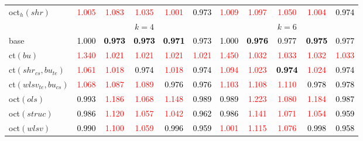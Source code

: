 \begin{tabular}[t]{l|>{}cccc>{}c|ccccc}
oct$_h(shr)$ & \textcolor{red}{1.005} & \textcolor{red}{1.083} & \textcolor{red}{1.035} & \textcolor{red}{1.001} & \textcolor{black}{0.973} & \textcolor{red}{1.009} & \textcolor{red}{1.097} & \textcolor{red}{1.050} & \textcolor{red}{1.004} & \textcolor{black}{0.974}\\
\addlinespace[0.3em]
\multicolumn{1}{c}{} & \multicolumn{5}{c}{\textbf{$k = 4$}} & \multicolumn{5}{c}{\textbf{$k = 6$}}\\
base & \textcolor{black}{1.000} & \textcolor{black}{\textbf{0.973}} & \textcolor{black}{\textbf{0.973}} & \textcolor{black}{\textbf{0.971}} & \textcolor{black}{0.973} & \textcolor{black}{1.000} & \textcolor{black}{\textbf{0.976}} & \textcolor{black}{0.977} & \textcolor{black}{\textbf{0.975}} & \textcolor{black}{0.977}\\
ct$(bu)$ & \textcolor{red}{1.340} & \textcolor{red}{1.021} & \textcolor{red}{1.021} & \textcolor{red}{1.021} & \textcolor{red}{1.021} & \textcolor{red}{1.450} & \textcolor{red}{1.032} & \textcolor{red}{1.033} & \textcolor{red}{1.032} & \textcolor{red}{1.033}\\
ct$(shr_{cs}, bu_{te})$ & \textcolor{red}{1.061} & \textcolor{red}{1.018} & \textcolor{black}{0.974} & \textcolor{red}{1.018} & \textcolor{black}{0.974} & \textcolor{red}{1.094} & \textcolor{red}{1.023} & \textcolor{black}{\textbf{0.974}} & \textcolor{red}{1.024} & \textcolor{black}{0.974}\\
ct$(wlsv_{te}, bu_{cs})$ & \textcolor{red}{1.068} & \textcolor{red}{1.087} & \textcolor{red}{1.089} & \textcolor{black}{0.976} & \textcolor{black}{0.976} & \textcolor{red}{1.103} & \textcolor{red}{1.108} & \textcolor{red}{1.110} & \textcolor{black}{0.978} & \textcolor{black}{0.978}\\
oct$(ols)$ & \textcolor{black}{0.993} & \textcolor{red}{1.186} & \textcolor{red}{1.068} & \textcolor{red}{1.148} & \textcolor{black}{0.989} & \textcolor{black}{0.989} & \textcolor{red}{1.223} & \textcolor{red}{1.080} & \textcolor{red}{1.184} & \textcolor{black}{0.987}\\
oct$(struc)$ & \textcolor{black}{0.986} & \textcolor{red}{1.120} & \textcolor{red}{1.057} & \textcolor{red}{1.042} & \textcolor{black}{0.962} & \textcolor{black}{0.986} & \textcolor{red}{1.141} & \textcolor{red}{1.071} & \textcolor{red}{1.054} & \textcolor{black}{0.959}\\
oct$(wlsv)$ & \textcolor{black}{0.990} & \textcolor{red}{1.100} & \textcolor{red}{1.059} & \textcolor{black}{0.996} & \textcolor{black}{0.959} & \textcolor{red}{1.001} & \textcolor{red}{1.115} & \textcolor{red}{1.076} & \textcolor{black}{0.998} & \textcolor{black}{0.958}\\

\end{tabular}
